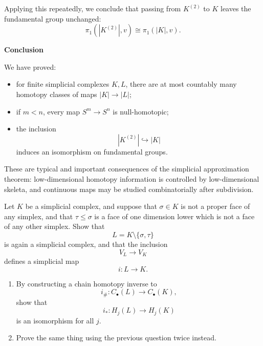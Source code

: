 \begin{solution}
Applying this repeatedly, we conclude that passing from \(K^{(2)}\) to \(K\) leaves the fundamental group unchanged:
\[
\pi_1(|K^{(2)}|,v)\cong \pi_1(|K|,v).
\]


\medskip
\noindent\textbf{Conclusion}\par
\smallskip


We have proved:

\begin{itemize}
	\item for finite simplicial complexes \(K,L\), there are at most countably many homotopy classes of maps \(|K|\to |L|\);
	\item if \(m<n\), every map \(S^m\to S^n\) is null-homotopic;
	\item the inclusion
	\[
	|K^{(2)}|\hookrightarrow |K|
	\]
	induces an isomorphism on fundamental groups.
\end{itemize}

These are typical and important consequences of the simplicial approximation theorem: low-dimensional homotopy information is controlled by low-dimensional skeleta, and continuous maps may be studied combinatorially after subdivision.

\par
\end{solution}

\begin{problem}
Let \(K\) be a simplicial complex, and suppose that \(\sigma\in K\) is not a proper face of any simplex, and that \(\tau\le \sigma\) is a face of one dimension lower which is not a face of any other simplex. Show that
\[
L=K\setminus \{\sigma,\tau\}
\]
is again a simplicial complex, and that the inclusion
\[
V_L\to V_K
\]
defines a simplicial map
\[
i:L\to K.
\]

\begin{enumerate}
	\item[(i)] By constructing a chain homotopy inverse to
	\[
	i_\#:C_\bullet(L)\to C_\bullet(K),
	\]
	show that
	\[
	i_*:H_j(L)\to H_j(K)
	\]
	is an isomorphism for all \(j\).

	\item[(ii)] Prove the same thing using the previous question twice instead.
\end{enumerate}
\end{problem}

